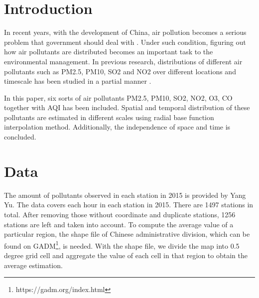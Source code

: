 \documentclass[letterpaper]{article}
\begin{document}
%
\title{}
\author{}
\maketitle
\begin{abstract}
\begin{quote}
\end{quote}
\end{abstract}


\begin{CJK*}{UTF8}{gkai}
\section{Introduction}
In recent years, with the development of China, air pollution becomes a serious problem that government should deal with . Under such condition, figuring out how air pollutants are distributed becomes an important task to the environmental management. In previous research, distributions of different air pollutants such as PM2.5, PM10, SO2 and NO2 over different locations and timescale has been studied in a partial manner .

In this paper, six sorts of air pollutants PM2.5, PM10, SO2, NO2, O3, CO together with AQI has been included. Spatial and temporal distribution of these pollutants are estimated in different scales using radial base function interpolation method. Additionally, the independence of space and time is concluded. 

\section{Data}

The amount of pollutants observed in each station in 2015 is provided by Yang Yu. The data covers each hour in each station in 2015. There are 1497 stations in total. After removing those without coordinate and duplicate stations, 1256 stations are left and taken into account. To compute the average value of a particular region, the shape file of Chinese administrative division, which can be found on GADM\footnote{https://gadm.org/index.html}, is needed. With the shape file, we divide the map into 0.5 degree grid cell and aggregate the value of each cell in that region to obtain the average estimation.


\end{CJK*}
\end{document}
